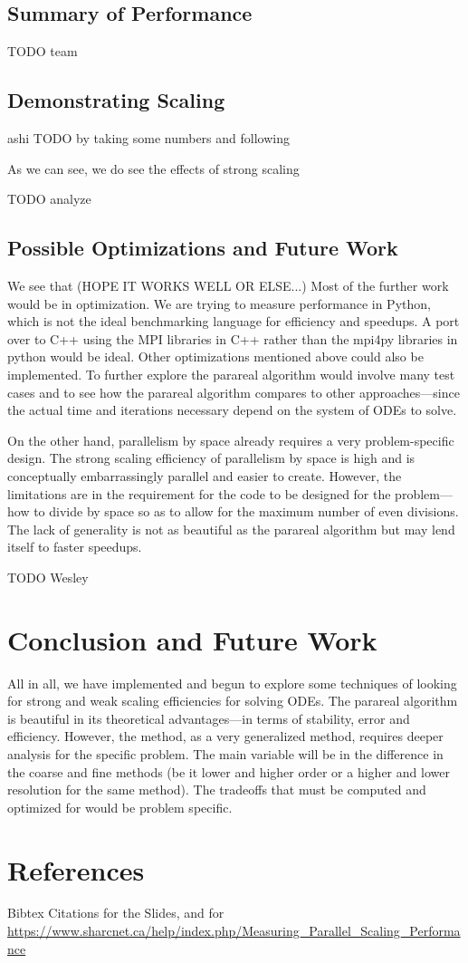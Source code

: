 \documentclass[letterpaper,12pt]{article}
\begin{document}
\subsection{Summary of Performance}

TODO team

\subsection{Demonstrating Scaling}

ashi TODO by taking some numbers and following

As we can see, we do see the effects of strong scaling

TODO analyze

\subsection{Possible Optimizations and Future Work}

We see that (HOPE IT WORKS WELL OR ELSE...) Most of the further work would be in
optimization. We are trying to measure performance in Python, which is not the
ideal benchmarking language for efficiency and speedups. A port over to C++
using the MPI libraries in C++ rather than the mpi4py libraries in python would
be ideal. Other optimizations mentioned above could also be implemented. To
further explore the parareal algorithm would involve many test cases and to see
how the parareal algorithm compares to other approaches---since the actual time
and iterations necessary depend on the system of ODEs to solve.

On the other hand, parallelism by space already requires a very problem-specific
design. The strong scaling efficiency of parallelism by space is high and is
conceptually embarrassingly parallel and easier to create. However, the
limitations are in the requirement for the code to be designed for the
problem---how to divide by space so as to allow for the maximum number of even
divisions. The lack of generality is not as beautiful as the parareal algorithm
but may lend itself to faster speedups.

TODO Wesley

\section{Conclusion and Future Work}


All in all, we have implemented and begun to explore some techniques of looking
for strong and weak scaling efficiencies for solving ODEs. The parareal
algorithm is beautiful in its theoretical advantages---in terms of stability,
error and efficiency. However, the method, as a very generalized method,
requires deeper analysis for the specific problem. The main variable will be in
the difference in the coarse and fine methods (be it lower and higher order or a
higher and lower resolution for the same method). The tradeoffs that must be
computed and optimized for would be problem specific.

\section{References}

Bibtex Citations for the Slides, and for \url{https://www.sharcnet.ca/help/index.php/Measuring_Parallel_Scaling_Performance}
\end{document}
